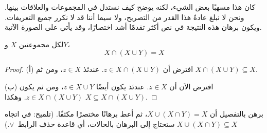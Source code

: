 \documentclass[../../../include/open-logic-section]{subfiles}
\begin{document}
\begin{explain}
كان هذا مسهبًا بعض الشيء، لكنه يوضح كيف نستدل في المجموعات والعلاقات
بينها. ونحن لا نبلغ عادةً هذا القدر من التصريح، ولا سيما أننا قد لا
نكرر جميع التعريفات. ويكون برهان هذه النتيجة في نص أكثر تقدمًا أشد
اختصارًا، وقد يأتي على الصورة الآتية.
\end{explain}


\begin{prop}[الامتصاص]
لكل مجموعتين $X$ و$Y$،
\[
X \cap (X \cup Y) = X
\]
\end{prop}

\begin{proof}
(أ) افترض أن $z \in X \cap (X \cup Y)$. عندئذ $z \in X$، ومن ثم
  $X \cap (X \cup Y) \subseteq X$.

(ب) افترض الآن أن $z \in X$. عندئذ يكون أيضًا $z \in X \cup Y$،
  ومن ثم يكون $z \in X \cap (X \cup Y)$. وهكذا
  $X \subseteq X \cap (X \cup Y)$.
\end{proof}

\begin{prob}
برهن بالتفصيل أن $X \cup (X \cap Y) = X$، ثم أعط برهانًا مختصرًا
مكثفًا. (تلميح: في اتجاه $X \cup (X \cap Y) \subseteq X$ ستحتاج
إلى البرهان بالحالات، أي قاعدة حذف الرابط~$\lor$.)
\end{prob}
\end{document}
